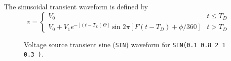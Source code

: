 The sinusoidal transient waveform is defined by
\begin{equation}
v = \left\{ \begin{array}{ll}
V_0                         & t \le T_D\\
V_0 + V_1 e^{-[\textstyle (t -T_D)\Theta]} \sin{2\pi[F(t-T_D) + \phi/360]}
                            & t > T_D
     \end{array} \right. %
\end{equation}

\begin{figure}[hbp]
\centering

\caption[Voltage source transient sine ({\tt SIN}) waveform]{Voltage source transient
sine ({\tt SIN}) waveform for\newline \hspace*{\fill}
{\tt SIN(0.1 0.8 2 1 0.3 )}.  \label{fig:vsin} \hspace*{\fill}}
\end{figure}
